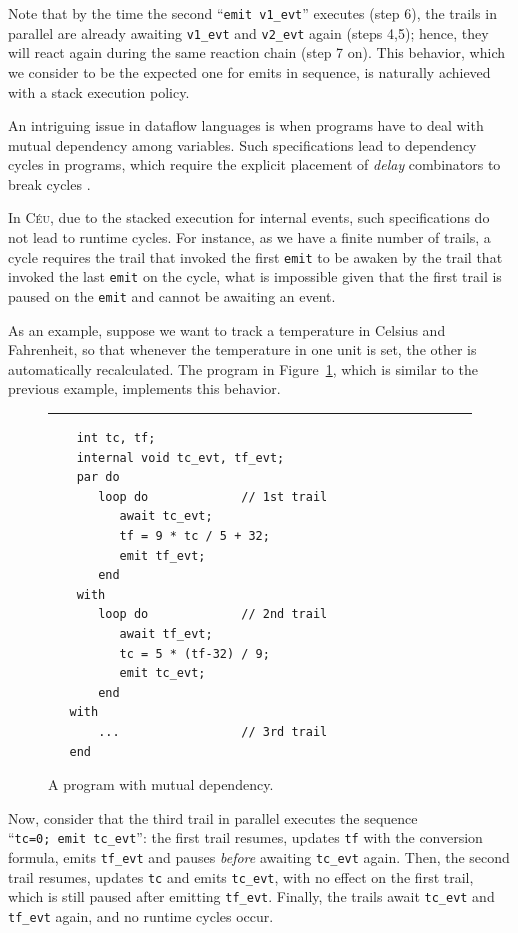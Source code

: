 \documentclass{sigplan-proc}
\newcommand{\2}{\;\;}
\newcommand{\5}{\;\;\;\;\;}
\newcommand{\CEU}{\textsc{C\'{e}u}}
\newcommand{\code}[1] {{\small{\texttt{#1}}}}
\begin{document}
Note that by the time the second ``\code{emit v1\_evt}'' executes (step 6), the 
trails in parallel are already awaiting \code{v1\_evt} and \code{v2\_evt} again 
(steps 4,5); hence, they will react again during the same reaction chain (step 
7 on).
This behavior, which we consider to be the expected one for emits in sequence, 
is naturally achieved with a stack execution policy.

An intriguing issue in dataflow languages is when programs have to deal with 
mutual dependency among variables.
Such specifications lead to dependency cycles in programs, which require the
explicit placement of \emph{delay} combinators to break cycles
\cite{frtime.embedding}.

In \CEU, due to the stacked execution for internal events, such specifications 
do not lead to runtime cycles.
For instance, as we have a finite number of trails, a cycle requires the trail 
that invoked the first \code{emit} to be awaken by the trail that invoked the 
last \code{emit} on the cycle, what is impossible given that the first trail is 
paused on the \code{emit} and cannot be awaiting an event.

As an example, suppose we want to track a temperature in Celsius and 
Fahrenheit, so that whenever the temperature in one unit is set, the other is 
automatically recalculated.
The program in Figure~\ref{lst:ceu:frp:2}, which is similar to the previous 
example, implements this behavior.

\begin{figure}[t]
\rule{8.5cm}{0.37pt}
{\small
\begin{verbatim}
    int tc, tf;
    internal void tc_evt, tf_evt;
    par do
       loop do             // 1st trail
          await tc_evt;
          tf = 9 * tc / 5 + 32;
          emit tf_evt;
       end
    with
       loop do             // 2nd trail
          await tf_evt;
          tc = 5 * (tf-32) / 9;
          emit tc_evt;
       end
   with
       ...                 // 3rd trail
   end
\end{verbatim}
}
\caption{ A program with mutual dependency.
\label{lst:ceu:frp:2}
}
\end{figure}

Now, consider that the third trail in parallel executes the sequence 
``\code{tc=0;~emit~tc\_evt}'': the first trail resumes, updates \code{tf} with 
the conversion formula, emits \code{tf\_evt} and pauses \emph{before} awaiting 
\code{tc\_evt} again.
Then, the second trail resumes, updates \code{tc} and emits \code{tc\_evt}, 
with no effect on the first trail, which is still paused after emitting 
\code{tf\_evt}.
Finally, the trails await \code{tc\_evt} and \code{tf\_evt} again, and no 
runtime cycles occur.
\end{document}
